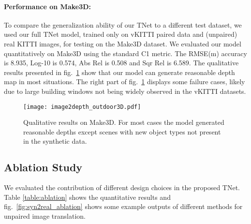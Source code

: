 \documentclass[runningheads]{llncs}
\begin{document}
\paragraph{\bf Performance on Make3D:} To compare the generalization ability of our TNet to a different test dataset, we used our full TNet model, trained only on vKITTI paired data and (unpaired) real KITTI images, for testing on the Make3D dataset\cite{saxena2009make3d}. We evaluated our model quantitatively on Make3D using the standard C1 metric. The RMSE(m) accuracy is 8.935, Log-10 is 0.574, Abs Rel is  0.508 and Sqr Rel is 6.589. The qualitative results presented in fig.~\ref{fig:depth_outdoor3D} show that our model can generate reasonable depth map in most situations. The right part of fig.~\ref{fig:depth_outdoor3D} displays some failure cases, likely due to large building windows not being widely observed in the vKITTI datasets.

\begin{figure}[tb!]
	\centering
	\texttt{[image: image2depth\_outdoor3D.pdf]}
	\caption{Qualitative results on Make3D. For most cases the model generated reasonable depths except scenes with new object types not present in the synthetic data. }
	\label{fig:depth_outdoor3D}
\end{figure}

\subsection{Ablation Study}

We evaluated the contribution of different design choices in the proposed TNet. Table \ref{table:ablation} shows the quantitative results and fig.~\ref{fig:syn2real_ablation} shows some example outputs of different methods for unpaired image translation.
\end{document}
